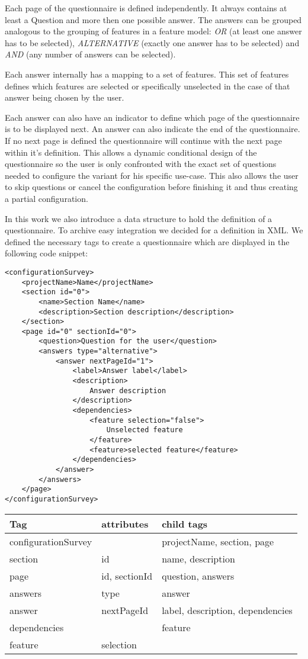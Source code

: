 Each page of the questionnaire is defined independently. It always contains at least a Question and more then one possible answer. The answers can be grouped analogous to the grouping of features in a feature model: \textit{OR} (at least one answer has to be selected), \textit{ALTERNATIVE} (exactly one answer has to be selected) and \textit{AND} (any number of answers can be selected).

Each answer internally has a mapping to a set of features. This set of features defines which features are selected or specifically unselected in the case of that answer being chosen by the user.

Each answer can also have an indicator to define which page of the questionnaire is to be displayed next. An answer can also indicate the end of the questionnaire. If no next page is defined the questionnaire will continue with the next page within it's definition. This allows a dynamic conditional design of the questionnaire so the user is only confronted with the exact set of questions needed to configure the variant for his specific use-case. This also allows the user to skip questions or cancel the configuration before finishing it and thus creating a partial configuration.

In this work we also introduce a data structure to hold the definition of a questionnaire. To archive easy integration we decided for a definition in XML. We defined the necessary tags to create a questionnaire which are displayed in the following code snippet:

\begin{lstlisting}
<configurationSurvey>
	<projectName>Name</projectName>
	<section id="0">
		<name>Section Name</name>
		<description>Section description</description>
	</section>
	<page id="0" sectionId="0">
		<question>Question for the user</question>
		<answers type="alternative">
			<answer nextPageId="1">
				<label>Answer label</label>
				<description>
					Answer description
				</description>
				<dependencies>
					<feature selection="false">
						Unselected feature
					</feature>
					<feature>selected feature</feature>
				</dependencies>
			</answer>
		</answers>
	</page>
</configurationSurvey>
\end{lstlisting}

\begin{tabulary}{\linewidth}{LLL}
\textbf{Tag} & \textbf{attributes} & \textbf{child tags}\\
\hline
configurationSurvey & & projectName, section, page\\
section & id & name, description\\
page & id, sectionId & question, answers\\
answers & type & answer\\
answer & nextPageId & label, description, dependencies\\
dependencies & & feature\\
feature & selection & \\
\end{tabulary}\vspace{2.5em}

